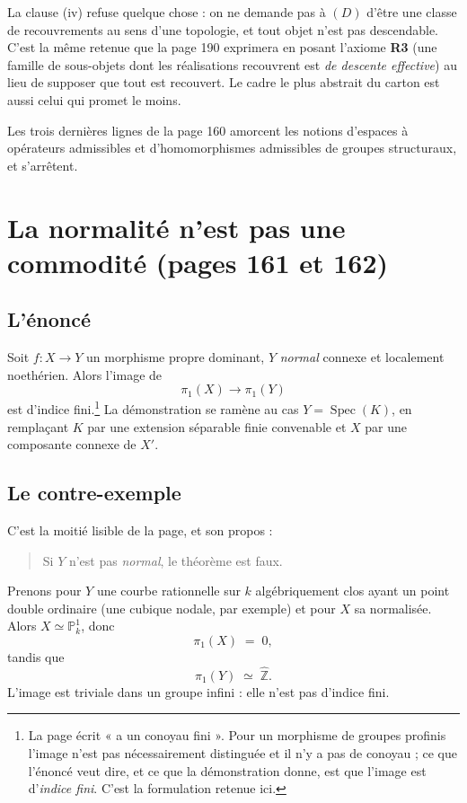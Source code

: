 \documentclass[11pt,a4paper]{article}
\begin{document}
La clause (iv) refuse quelque chose : on ne demande pas à
$(D)$ d'être une classe de recouvrements au sens d'une topologie, et tout objet
n'est pas descendable. C'est la même retenue que la page 190 exprimera en
posant l'axiome \textbf{R3} (une famille de sous-objets dont les
réalisations recouvrent est \emph{de descente effective}) au lieu de
supposer que tout est recouvert. Le cadre le plus abstrait du carton est aussi
celui qui promet le moins.

Les trois dernières lignes de la page 160 amorcent les notions d'espaces à
opérateurs admissibles et d'homomorphismes admissibles de groupes structuraux,
et s'arrêtent.

\section*{La normalité n'est pas une commodité (pages 161 et 162)}

\subsection*{L'énoncé}

Soit $f : X \to Y$ un morphisme propre dominant, $Y$ \emph{normal} connexe et
localement noethérien. Alors l'image de
\[
  \pi_{1}(X) \longrightarrow \pi_{1}(Y)
\]
est d'indice fini.\footnote{La page écrit « a un conoyau fini ». Pour un
morphisme de groupes profinis l'image n'est pas nécessairement distinguée et il
n'y a pas de conoyau ; ce que l'énoncé veut dire, et ce que la démonstration
donne, est que l'image est d'\emph{indice fini}. C'est la formulation retenue
ici.} La démonstration se ramène au cas $Y = \operatorname{Spec}(K)$, en
remplaçant $K$ par une extension séparable finie convenable et $X$ par une
composante connexe de $X'$.

\subsection*{Le contre-exemple}

C'est la moitié lisible de la page, et son propos :

\begin{quote}
Si $Y$ n'est pas \emph{normal}, le théorème est faux.
\end{quote}

Prenons pour $Y$ une courbe rationnelle sur $k$ algébriquement clos ayant un
point double ordinaire (une cubique nodale, par exemple) et pour $X$ sa
normalisée. Alors $X \simeq \mathbb{P}^{1}_{k}$, donc
\[
  \pi_{1}(X) \;=\; 0 ,
\]
tandis que
\[
  \pi_{1}(Y) \;\simeq\; \hat{\mathbb{Z}} .
\]
L'image est triviale dans un groupe infini : elle n'est pas d'indice fini.
\end{document}
